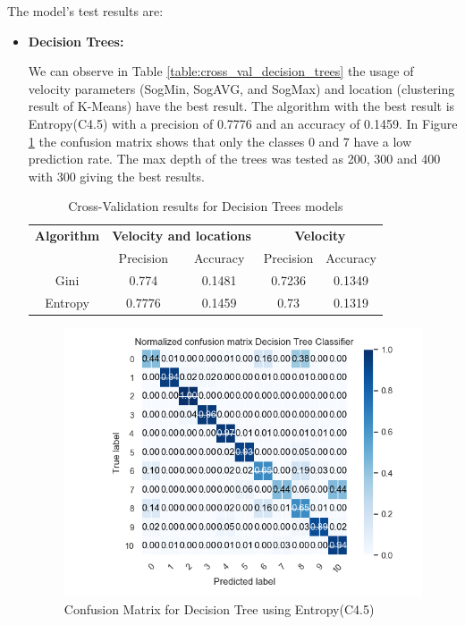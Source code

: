 The model's test results are:
\newpage
\begin{itemize}
\item \textbf{ Decision Trees: }

We can observe in Table \ref{table:cross_val_decision_trees} the usage of velocity parameters (SogMin, SogAVG, and SogMax) and location (clustering result of K-Means) have the best result. The algorithm with the best result is Entropy(C4.5) with a precision of 0.7776 and an accuracy of 0.1459. In Figure \ref{table:cross_val_dt} the confusion matrix shows that only the classes 0 and 7 have a low prediction rate. The max depth of the trees was tested as 200, 300 and 400 with 300 giving the best results.


\begin {table}[H]
\begin{center}
\begin{tabular}{c|c|c|c|c}
\multicolumn{1}{c|}{\textbf{Algorithm } }   &\multicolumn{2}{c|}{\textbf{ Velocity and locations}}& \multicolumn{2}{c}{\textbf{ Velocity}}\\
&Precision & Accuracy & Precision & Accuracy \\
\hline
Gini   &0.774&0.1481&0.7236&0.1349\\
Entropy&0.7776&0.1459&0.73&0.1319
\label{table:cross_val_dt}
\end{tabular}
\caption {Cross-Validation results for Decision Trees models}
\end{center}
\end {table}

\begin{figure}[h]
    \centering
    \includegraphics[width=0.8\linewidth]{Chapters/img/CM_DT.png}
    \caption{Confusion Matrix for Decision Tree using Entropy(C4.5)}
    \label{fig:cm_dt}
\end{figure}



\end{itemize}
